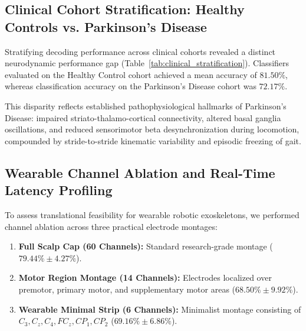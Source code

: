 \documentclass[review,12pt]{elsarticle}
\begin{document}
\subsection{Clinical Cohort Stratification: Healthy Controls vs. Parkinson's Disease}
Stratifying decoding performance across clinical cohorts revealed a distinct neurodynamic performance gap (Table~\ref{tab:clinical_stratification}). Classifiers evaluated on the Healthy Control cohort achieved a mean accuracy of $81.50\%$, whereas classification accuracy on the Parkinson's Disease cohort was $72.17\%$.

\begin{table}[htbp]
\centering
\caption{Cross-Subject Decoding Stratification by Clinical Diagnostic Cohort}
\label{tab:clinical_stratification}
\vspace{0.4em}
\end{table}

This disparity reflects established pathophysiological hallmarks of Parkinson's Disease: impaired striato-thalamo-cortical connectivity, altered basal ganglia oscillations, and reduced sensorimotor beta desynchronization during locomotion, compounded by stride-to-stride kinematic variability and episodic freezing of gait.

\subsection{Wearable Channel Ablation and Real-Time Latency Profiling}
To assess translational feasibility for wearable robotic exoskeletons, we performed channel ablation across three practical electrode montages:
\begin{enumerate}
    \item \textbf{Full Scalp Cap (60 Channels):} Standard research-grade montage ($79.44\% \pm 4.27\%$).
    \item \textbf{Motor Region Montage (14 Channels):} Electrodes localized over premotor, primary motor, and supplementary motor areas ($68.50\% \pm 9.92\%$).
    \item \textbf{Wearable Minimal Strip (6 Channels):} Minimalist montage consisting of $C_3, C_z, C_4, FC_z, CP_1, CP_2$ ($69.16\% \pm 6.86\%$).
\end{enumerate}
\end{document}
